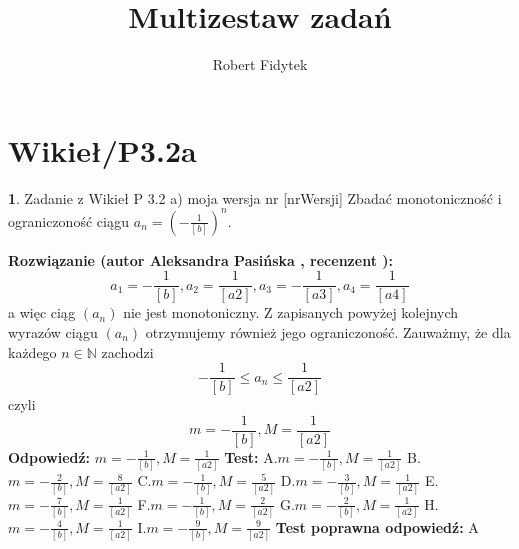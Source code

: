 \documentclass[12pt, a4paper]{article}
\title{Multizestaw zadań}
\author{Robert Fidytek}
\date{}
\theoremstyle{definition} %
\newtheorem{zad}{}
\newcommand{\kategoria}[1]{\section{#1}} %
\newcommand{\zadStart}[1]{\begin{zad}#1\newline} %
\newcommand{\zadStop}{\end{zad}}   %
\newcommand{\rozwStart}[2]{\noindent \textbf{Rozwiązanie (autor #1 , recenzent #2): }\newline} %
\newcommand{\rozwStop}{\newline}                                            %
\newcommand{\odpStart}{\noindent \textbf{Odpowiedź:}\newline}    %
\newcommand{\odpStop}{\newline}                                             %
\newcommand{\testStart}{\noindent \textbf{Test:}\newline} %
\newcommand{\testStop}{\newline} %
\newcommand{\kluczStart}{\noindent \textbf{Test poprawna odpowiedź:}\newline} %
\newcommand{\kluczStop}{\newline} %
\begin{document}
\maketitle


\kategoria{Wikieł/P3.2a}
\zadStart{Zadanie z Wikieł P 3.2 a) moja wersja nr [nrWersji]}
Zbadać monotoniczność i ograniczoność ciągu $a_{n}=\left(-\frac{1}{[b]}\right)^n$.
\zadStop
\rozwStart{Aleksandra Pasińska}{}
$$a_{1}=-\frac{1}{[b]}, a_{2}=\frac{1}{[a2]},a_{3}=-\frac{1}{[a3]},a_{4}=\frac{1}{[a4]}$$ 
a więc ciąg $(a_{n})$ nie jest monotoniczny.
Z zapisanych powyżej kolejnych wyrazów ciągu $(a_{n})$ otrzymujemy również jego ograniczoność. Zauważmy, że dla każdego $n \in \mathbb{N}$ zachodzi 
$$-\frac{1}{[b]}\leq a_{n} \leq \frac{1}{[a2]}$$
czyli
$$m=-\frac{1}{[b]},M=\frac{1}{[a2]}$$
\rozwStop
\odpStart
$m=-\frac{1}{[b]},M=\frac{1}{[a2]}$
\odpStop
\testStart
A.$m=-\frac{1}{[b]},M=\frac{1}{[a2]}$
B.$m=-\frac{2}{[b]},M=\frac{8}{[a2]}$
C.$m=-\frac{1}{[b]},M=\frac{5}{[a2]}$
D.$m=-\frac{3}{[b]},M=\frac{1}{[a2]}$
E.$m=-\frac{7}{[b]},M=\frac{1}{[a2]}$
F.$m=-\frac{1}{[b]},M=\frac{2}{[a2]}$
G.$m=-\frac{2}{[b]},M=\frac{1}{[a2]}$
H.$m=-\frac{4}{[b]},M=\frac{1}{[a2]}$
I.$m=-\frac{9}{[b]},M=\frac{9}{[a2]}$
\testStop
\kluczStart
A
\kluczStop
\end{document}
